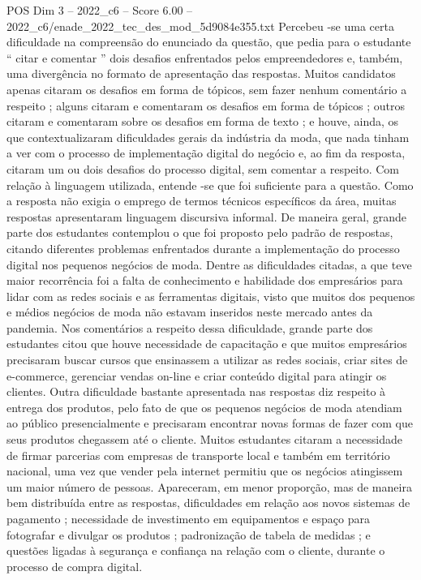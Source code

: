 \begin{textsample}{POS Dim 3 – 2022\_c6 – Score 6.00 – 2022\_c6/enade\_2022\_tec\_des\_mod\_5d9084e355.txt}
Percebeu -se uma certa dificuldade na compreensão do enunciado da questão, que pedia para o estudante “ citar e comentar ” dois desafios enfrentados pelos empreendedores e, também, uma divergência no formato de apresentação das respostas.
Muitos candidatos apenas citaram os desafios em forma de tópicos, sem fazer nenhum comentário a respeito ; alguns citaram e comentaram os desafios em forma de tópicos ; outros citaram e comentaram sobre os desafios em forma de texto ; e houve, ainda, os que contextualizaram dificuldades gerais da indústria da moda, que nada tinham a ver com o processo de implementação digital do negócio e, ao fim da resposta, citaram um ou dois desafios do processo digital, sem comentar a respeito.
Com relação à linguagem utilizada, entende -se que foi suficiente para a questão.
Como a resposta não exigia o emprego de termos técnicos específicos da área, muitas respostas apresentaram linguagem discursiva informal.
De maneira geral, grande parte dos estudantes contemplou o que foi proposto pelo padrão de respostas, citando diferentes problemas enfrentados durante a implementação do processo digital nos pequenos negócios de moda.
Dentre as dificuldades citadas, a que teve maior recorrência foi a falta de conhecimento e habilidade dos empresários para lidar com as redes sociais e as ferramentas digitais, visto que muitos dos pequenos e médios negócios de moda não estavam inseridos neste mercado antes da pandemia.
Nos comentários a respeito dessa dificuldade, grande parte dos estudantes citou que houve necessidade de capacitação e que muitos empresários precisaram buscar cursos que ensinassem a utilizar as redes sociais, criar sites de e-commerce, gerenciar vendas on-line e criar conteúdo digital para atingir os clientes.
Outra dificuldade bastante apresentada nas respostas diz respeito à entrega dos produtos, pelo fato de que os pequenos negócios de moda atendiam ao público presencialmente e precisaram encontrar novas formas de fazer com que seus produtos chegassem até o cliente.
Muitos estudantes citaram a necessidade de firmar parcerias com empresas de transporte local e também em território nacional, uma vez que vender pela internet permitiu que os negócios atingissem um maior número de pessoas.
Apareceram, em menor proporção, mas de maneira bem distribuída entre as respostas, dificuldades em relação aos novos sistemas de pagamento ; necessidade de investimento em equipamentos e espaço para fotografar e divulgar os produtos ; padronização de tabela de medidas ; e questões ligadas à segurança e confiança na relação com o cliente, durante o processo de compra digital.

\end{textsample}

